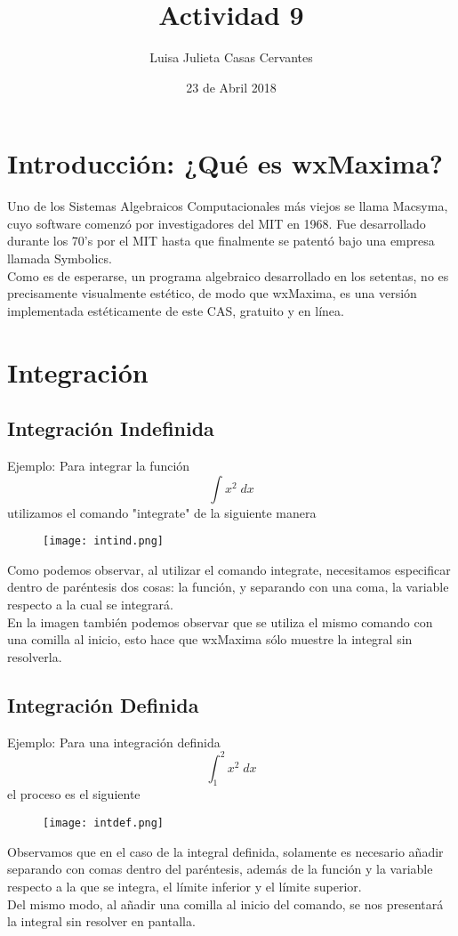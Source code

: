 \documentclass{article}
\title{Actividad 9}
\author{Luisa Julieta Casas Cervantes}
\date{23 de Abril 2018}
\begin{document}
\maketitle
\section{Introducción: ¿Qué es wxMaxima?}
Uno de los Sistemas Algebraicos Computacionales más viejos se llama Macsyma, cuyo software comenzó por investigadores del MIT en 1968. Fue desarrollado durante los 70's por el MIT hasta que finalmente se patentó bajo una empresa llamada Symbolics.
\\Como es de esperarse, un programa algebraico desarrollado en los setentas, no es precisamente visualmente estético, de modo que wxMaxima, es una versión implementada estéticamente de este CAS, gratuito y en línea. 
\section{Integración}
\subsection{Integración Indefinida}
Ejemplo: Para integrar la función $$\int {x^2}{\;dx}$$ utilizamos el comando "integrate" de la siguiente manera
\begin{figure}[H]
\texttt{[image: intind.png]}
\end{figure}
Como podemos observar, al utilizar el comando integrate, necesitamos especificar dentro de paréntesis dos cosas: la función, y separando con una coma, la variable respecto a la cual se integrará. 
\\En la imagen también podemos observar que se utiliza el mismo comando con una comilla al inicio, esto hace que wxMaxima sólo muestre la integral sin resolverla. 
\subsection{Integración Definida}
Ejemplo: Para una integración definida $$\int_{1}^{2}{x^2\;dx}$$ el proceso es el siguiente
\begin{figure}[H]
\texttt{[image: intdef.png]}
\end{figure}
Observamos que en el caso de la integral definida, solamente es necesario añadir separando con comas dentro del paréntesis, además de la función y la variable respecto a la que se integra, el límite inferior y el límite superior.
\\Del mismo modo, al añadir una comilla al inicio del comando, se nos presentará la integral sin resolver en pantalla. 
\end{document}
